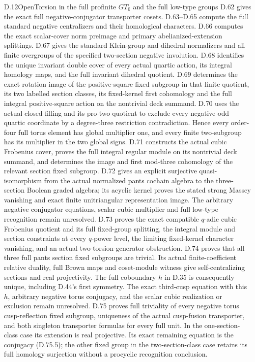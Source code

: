 \begin{claim}{D.12}{Open}{Torsion in the full profinite $GT_0$ and the full low-type groups}
D.62 gives the exact full negative-conjugator transporter cosets. D.63--D.65 compute the full standard negative centralizers and their homological characters. D.66 computes the exact scalar-cover norm preimage and primary abelianized-extension splittings. D.67 gives the standard Klein-group and dihedral normalizers and all finite overgroups of the specified two-section negative involution. D.68 identifies the unique invariant double cover of every actual quartic action, its integral homology maps, and the full invariant dihedral quotient. D.69 determines the exact rotation image of the positive-square fixed subgroup in that finite quotient, its two labelled section classes, its fixed-kernel first cohomology and the full integral positive-square action on the nontrivial deck summand. D.70 uses the actual closed filling and its pro-two quotient to exclude every negative odd quartic coordinate by a degree-three restriction contradiction. Hence every order-four full torus element has global multiplier one, and every finite two-subgroup has its multiplier in the two global signs. D.71 constructs the actual cubic Frobenius cover, proves the full integral regular module on its nontrivial deck summand, and determines the image and first mod-three cohomology of the relevant section fixed subgroup. D.72 gives an explicit surjective quasi-isomorphism from the actual normalized pants cochain algebra to the three-section Boolean graded algebra; its acyclic kernel proves the stated strong Massey vanishing and exact finite unitriangular representation image. The arbitrary negative conjugator equations, scalar cubic multiplier and full low-type recognition remain unresolved.
D.73 proves the exact compatible $q$-adic cubic Frobenius quotient and its full fixed-group splitting, the integral module and section constraints at every $q$-power level, the limiting fixed-kernel character vanishing, and an actual two-torsion-generator obstruction. D.74 proves that all three full pants section fixed subgroups are trivial. Its actual finite-coefficient relative duality, full Brown maps and coset-module witness give self-centralizing sections and real projectivity. The full coboundary $h$ in D.35 is consequently unique, including D.44's first symmetry. The exact third-cusp equation with this $h$, arbitrary negative torus conjugacy, and the scalar cubic realization or exclusion remain unresolved.
D.75 proves full triviality of every negative torus cusp-reflection fixed subgroup, uniqueness of the actual cusp-fusion transporter, and both singleton transporter formulas for every full unit. In the one-section-class case its extension is real projective. Its exact remaining equation is the conjugacy (D.75.5); the other fixed group in the two-section-class case retains its full homology surjection without a procyclic recognition conclusion.

\end{claim}
